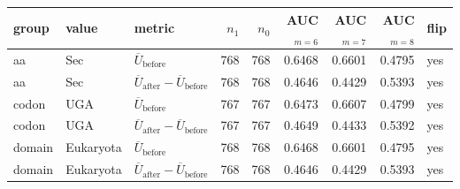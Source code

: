 \begingroup
{}
\small
\setlength{\tabcolsep}{6pt}
\renewcommand{\arraystretch}{1.15}
\setlength{\LTleft}{0pt}
\setlength{\LTright}{0pt}
\begin{longtable}{l l l r r r r r l}
\toprule
group & value & metric & $n_1$ & $n_0$ & AUC$_{m=6}$ & AUC$_{m=7}$ & AUC$_{m=8}$ & flip \\
\midrule
aa & Sec & $\overline{U}_{\mathrm{before}}$ & 768 & 768 & 0.6468 & 0.6601 & 0.4795 & yes \\
aa & Sec & $\overline{U}_{\mathrm{after}}-\overline{U}_{\mathrm{before}}$ & 768 & 768 & 0.4646 & 0.4429 & 0.5393 & yes \\
codon & UGA & $\overline{U}_{\mathrm{before}}$ & 767 & 767 & 0.6473 & 0.6607 & 0.4799 & yes \\
codon & UGA & $\overline{U}_{\mathrm{after}}-\overline{U}_{\mathrm{before}}$ & 767 & 767 & 0.4649 & 0.4433 & 0.5392 & yes \\
domain & Eukaryota & $\overline{U}_{\mathrm{before}}$ & 768 & 768 & 0.6468 & 0.6601 & 0.4795 & yes \\
domain & Eukaryota & $\overline{U}_{\mathrm{after}}-\overline{U}_{\mathrm{before}}$ & 768 & 768 & 0.4646 & 0.4429 & 0.5393 & yes \\
\bottomrule
\end{longtable}
\endgroup


